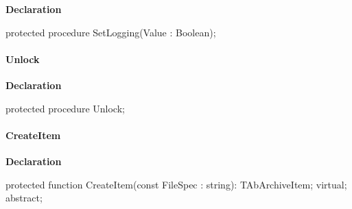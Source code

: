 \documentclass{report}
\newif\ifpdf
\begin{document}
\label{AbArcTyp.TAbArchive-SetLogging}
\begin{list}{}{
\setlength{\itemindent}{0cm}
\setlength{\listparindent}{0cm}
\setlength{\leftmargin}{\evensidemargin}
\addtolength{\leftmargin}{\tmplength}
\settowidth{\labelsep}{X}
\addtolength{\leftmargin}{\labelsep}
\setlength{\labelwidth}{\tmplength}
}
\item[\textbf{Declaration}\hfill]
\ifpdf
\begin{flushleft}
\fi
\begin{ttfamily}
protected procedure SetLogging(Value : Boolean);\end{ttfamily}

\ifpdf
\end{flushleft}
\fi

\end{list}
\paragraph*{Unlock}\hspace*{\fill}

\label{AbArcTyp.TAbArchive-Unlock}
\begin{list}{}{
\setlength{\itemindent}{0cm}
\setlength{\listparindent}{0cm}
\setlength{\leftmargin}{\evensidemargin}
\addtolength{\leftmargin}{\tmplength}
\settowidth{\labelsep}{X}
\addtolength{\leftmargin}{\labelsep}
\setlength{\labelwidth}{\tmplength}
}
\item[\textbf{Declaration}\hfill]
\ifpdf
\begin{flushleft}
\fi
\begin{ttfamily}
protected procedure Unlock;\end{ttfamily}

\ifpdf
\end{flushleft}
\fi

\end{list}
\paragraph*{CreateItem}\hspace*{\fill}

\label{AbArcTyp.TAbArchive-CreateItem}
\begin{list}{}{
\setlength{\itemindent}{0cm}
\setlength{\listparindent}{0cm}
\setlength{\leftmargin}{\evensidemargin}
\addtolength{\leftmargin}{\tmplength}
\settowidth{\labelsep}{X}
\addtolength{\leftmargin}{\labelsep}
\setlength{\labelwidth}{\tmplength}
}
\item[\textbf{Declaration}\hfill]
\ifpdf
\begin{flushleft}
\fi
\begin{ttfamily}
protected function CreateItem(const FileSpec : string): TAbArchiveItem; virtual; abstract;\end{ttfamily}

\ifpdf
\end{flushleft}
\fi

\end{list}
\end{document}
